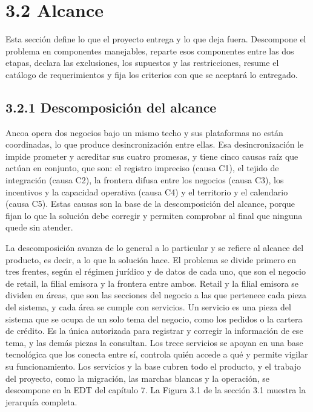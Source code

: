 \documentclass[11pt]{article}
\begin{document}
\section{3.2 Alcance}

Esta sección define lo que el proyecto entrega y lo que deja fuera. Descompone el problema en componentes manejables, reparte esos componentes entre las dos etapas, declara las exclusiones, los supuestos y las restricciones, resume el catálogo de requerimientos y fija los criterios con que se aceptará lo entregado.

\subsection{3.2.1 Descomposición del alcance}

Ancoa opera dos negocios bajo un mismo techo y sus plataformas no están coordinadas, lo que produce desincronización entre ellas. Esa desincronización le impide prometer y acreditar sus cuatro promesas, y tiene cinco causas raíz que actúan en conjunto, que son: el registro impreciso (causa C1), el tejido de integración (causa C2), la frontera difusa entre los negocios (causa C3), los incentivos y la capacidad operativa (causa C4) y el territorio y el calendario (causa C5). Estas causas son la base de la descomposición del alcance, porque fijan lo que la solución debe corregir y permiten comprobar al final que ninguna quede sin atender.

La descomposición avanza de lo general a lo particular y se refiere al alcance del producto, es decir, a lo que la solución hace. El problema se divide primero en tres frentes, según el régimen jurídico y de datos de cada uno, que son el negocio de retail, la filial emisora y la frontera entre ambos. Retail y la filial emisora se dividen en áreas, que son las secciones del negocio a las que pertenece cada pieza del sistema, y cada área se cumple con servicios. Un servicio es una pieza del sistema que se ocupa de un solo tema del negocio, como los pedidos o la cartera de crédito. Es la única autorizada para registrar y corregir la información de ese tema, y las demás piezas la consultan. Los trece servicios se apoyan en una base tecnológica que los conecta entre sí, controla quién accede a qué y permite vigilar su funcionamiento. Los servicios y la base cubren todo el producto, y el trabajo del proyecto, como la migración, las marchas blancas y la operación, se descompone en la EDT del capítulo 7. La Figura 3.1 de la sección 3.1 muestra la jerarquía completa.
\end{document}
